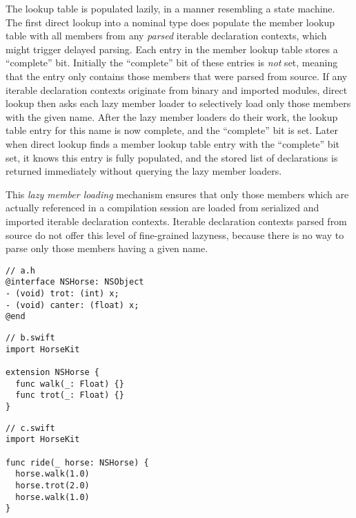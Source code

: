 \documentclass[../generics]{subfiles}
\begin{document}
The lookup table is populated lazily, in a manner resembling a state machine. The first direct lookup into a nominal type does populate the member lookup table with all members from any \emph{parsed} iterable declaration contexts, which might trigger delayed parsing. Each entry in the member lookup table stores a ``complete'' bit. Initially the ``complete'' bit of these entries is \emph{not} set, meaning that the entry only contains those members that were parsed from source. If any iterable declaration contexts originate from binary and imported modules, direct lookup then asks each lazy member loader to selectively load only those members with the given name. After the lazy member loaders do their work, the lookup table entry for this name is now complete, and the ``complete'' bit is set. Later when direct lookup finds a member lookup table entry with the ``complete'' bit set, it knows this entry is fully populated, and the stored list of declarations is returned immediately without querying the lazy member loaders.

This \emph{lazy member loading} mechanism ensures that only those members which are actually referenced in a compilation session are loaded from serialized and imported iterable declaration contexts. Iterable declaration contexts parsed from source do not offer this level of fine-grained lazyness, because there is no way to parse only those members having a given name.

\begin{listing}\label{lazy member listing}
\begin{Verbatim}
// a.h
@interface NSHorse: NSObject
- (void) trot: (int) x;
- (void) canter: (float) x;
@end
\end{Verbatim}
\begin{Verbatim}
// b.swift
import HorseKit

extension NSHorse {
  func walk(_: Float) {}
  func trot(_: Float) {}
}
\end{Verbatim}
\begin{Verbatim}
// c.swift
import HorseKit

func ride(_ horse: NSHorse) {
  horse.walk(1.0)
  horse.trot(2.0)
  horse.walk(1.0)
}
\end{Verbatim}
\end{listing}
\end{document}
